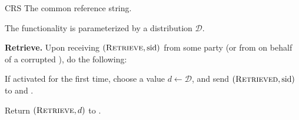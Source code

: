 \begin{cccFunctionality}
    {\funcCRS}
    {CRS}
    {The common reference string.}

    The functionality is parameterized by a distribution $\mathcal{D}$.

    \begin{cccItemize}[noitemsep]
        \item \textbf{Retrieve.} Upon receiving $(\textsc{Retrieve}, \mathrm{sid})$ from some party \party (or from \adv on behalf of a corrupted \party), do the following:
        \begin{cccEnum}[nosep]
            \item If activated for the first time, choose a value $d \gets \mathcal{D}$, and send $(\textsc{Retrieved}, \mathrm{sid})$ to \wrapper{\funcRO} and \wrapper{\funcDiffuse}.

            \item Return $(\textsc{Retrieve}, d)$ to \party.
        \end{cccEnum}
    \end{cccItemize}
\end{cccFunctionality}